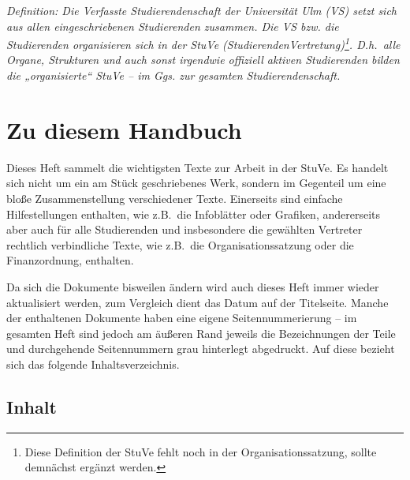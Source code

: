 
{
\footnotesize
\thispagestyle{empty}


\textit{Definition: Die Verfasste Studierendenschaft der Universität Ulm (VS) setzt sich aus allen eingeschriebenen Studierenden zusammen. Die VS bzw. die Studierenden organisieren sich in der StuVe (StudierendenVertretung)\footnote{Diese Definition der StuVe fehlt noch in der Organisationssatzung, sollte demnächst ergänzt werden.}. D.h.\ alle Organe, Strukturen und auch sonst irgendwie offiziell aktiven Studierenden bilden die „organisierte“ StuVe – im Ggs. zur gesamten Studierendenschaft.}

\section*{Zu diesem Handbuch}


Dieses Heft sammelt die wichtigsten Texte zur Arbeit in der StuVe. Es handelt sich nicht um ein am Stück geschriebenes Werk, sondern im Gegenteil um eine bloße Zusammenstellung verschiedener Texte. Einerseits sind einfache Hilfestellungen enthalten, wie z.B.\ die Infoblätter oder Grafiken, andererseits aber auch für alle Studierenden und insbesondere die gewählten Vertreter rechtlich verbindliche Texte, wie z.B.\ die Organisationssatzung oder die Finanzordnung, enthalten.

Da sich die Dokumente bisweilen ändern wird auch dieses Heft immer wieder aktualisiert werden, zum Vergleich dient das Datum auf der Titelseite. Manche der enthaltenen Dokumente haben eine eigene Seitennummerierung – im gesamten Heft sind jedoch am äußeren Rand jeweils die Bezeichnungen der Teile und durchgehende Seitennummern grau hinterlegt abgedruckt. Auf diese bezieht sich das folgende Inhaltsverzeichnis.

\subsection*{Inhalt}

}
